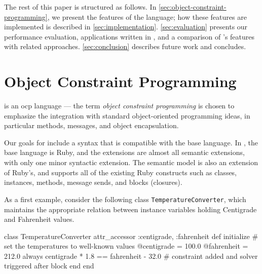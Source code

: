 
The rest of this paper is structured as follows. In
\autoref{sec:object-constraint-programming}, we present the features
of the language; how these features are implemented is described in
\autoref{sec:implementation}. \autoref{sec:evaluation} presents our
performance evaluation, applications written in \toolname, and a
comparison of \langname's features with related
approaches. \autoref{sec:conclusion} describes future work and
concludes.

\section{Object Constraint Programming}
\label{sec:object-constraint-programming}

\langname is an \ac{ocp} language --- the term \emph{object constraint
  programming} is chosen to emphasize the integration with standard
object-oriented programming ideas, in particular methods, messages,
and object encapsulation.

Our goals for \langname include a syntax that is compatible with the
base language.  In \toolname, the base language is Ruby, and the
extensions are almost all semantic extensions, with only one minor
syntactic extension.  The semantic model is also an extension of
Ruby's, and supports all of the existing Ruby constructs such as
classes, instances, methods, message sends, and blocks (closures).

As a first example, consider the following class
\lstinline{TemperatureConverter}, which maintains the appropriate
relation between instance variables holding Centigrade and Fahrenheit
values.

\begin{code}
class TemperatureConverter
  attr_accessor :centigrade, :fahrenheit
  def initialize                                                                
    # set the temperatures to well-known values
    @centigrade = 100.0
    @fahrenheit = 212.0
    always { centigrade * 1.8 == fahrenheit - 32.0 }
    # constraint added and solver triggered after block
  end
end                                                                           
\end{code}

